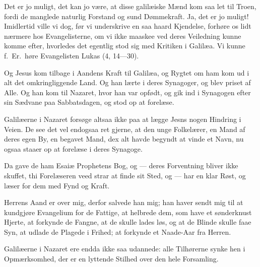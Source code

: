\documentclass[12pt,a4paper]{book}
\begin{document}
Det er jo muligt, det kan jo være, at disse galilæiske Mænd kom saa let til Troen, fordi
de manglede naturlig Forstand og
sund Dømmekraft. Ja, det er jo muligt! Imidlertid ville vi dog, før vi underskrive en saa
haard Kjendelse, forhøre os lidt nærmere hos Evangelisterne, om vi ikke maaskee ved deres
Veiledning kunne komme efter, hvorledes det egentlig stod sig med Kritiken i Galilæa. Vi
kunne f.\ Er.\ høre Evangelisten Lukas (4, 14---30).

\begingroup\large
Og Jesus kom tilbage i Aandens Kraft til Galilæa, og Rygtet om ham kom ud i alt det
omkringliggende Land. Og han lærte i deres Synagoger, og blev priset af Alle. Og han kom
til Nazaret, hvor han var opfødt, og gik ind i Synagogen efter sin Sædvane paa
Sabbatsdagen, og stod op at forelæse.
\par\endgroup

Galilæerne i Nazaret forsøge altsaa ikke paa at lægge Jesns nogen Hindring i Veien. De
see det vel endogsaa ret gjerne, at den unge Folkelærer, en Mand af deres egen By, en
begavet Mand, dex alt havde begyndt at vinde et Navn, nu ogsaa staaer op at forelæse i
deres Synagoge.

Da gave de ham Esaiæ Prophetens Bog, og --- deres Forventning bliver ikke skuffet, thi
Forelæseren veed strar at finde sit Sted, og --- har en klar Røst, og læser for dem med
Fynd og Kraft.

\begingroup\large
Herrens Aand er over mig, derfor salvede han mig; han haver sendt mig til at kundgjøre
Evangelium for de Fattige, at helbrede dem, som have et sønderknust Hjerte, at forkynde
de Fangne, at de skulle lades løs, og at de Blinde skulle faae Syn, at udlade de Plagede
i Frihed; at forkynde et Naade-Aar fra Herren.
\par\endgroup

Galilæerne i Nazaret ere endda ikke saa udannede: alle Tilhørerne synke hen i
Opmærksomhed, der er en lyttende Stilhed over den hele Forsamling.
\end{document}
